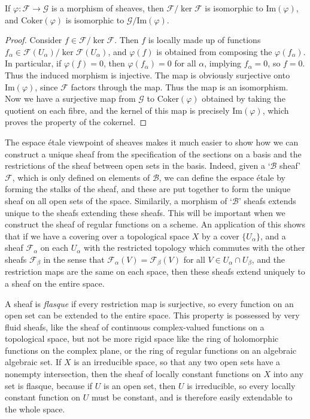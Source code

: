 \begin{theorem}
    If $\varphi: \mathcal{F} \to \mathcal{G}$ is a morphism of sheaves, then $\mathcal{F} / \ker \mathcal{F}$ is isomorphic to $\text{Im}(\varphi)$, and $\text{Coker}(\varphi)$ is isomorphic to $\mathcal{G} / \text{Im}(\varphi)$.
\end{theorem}
\begin{proof}
    Consider $f \in \mathcal{F} / \ker \mathcal{F}$. Then $f$ is locally made up of functions $f_\alpha \in \mathcal{F}(U_\alpha) / \ker \mathcal{F}(U_\alpha)$, and $\varphi(f)$ is obtained from composing the $\varphi(f_\alpha)$. In particular, if $\varphi(f) = 0$, then $\varphi(f_\alpha) = 0$ for all $\alpha$, implying $f_\alpha = 0$, so $f = 0$. Thus the induced morphism is injective. The map is obviously surjective onto $\text{Im}(\varphi)$, since $\mathcal{F}$ factors through the map. Thus the map is an isomorphism. Now we have a surjective map from $\mathcal{G}$ to $\text{Coker}(\varphi)$ obtained by taking the quotient on each fibre, and the kernel of this map is precisely $\text{Im}(\varphi)$, which proves the property of the cokernel.
\end{proof}

The espace \'{e}tale viewpoint of sheaves makes it much easier to show how we can construct a unique sheaf from the specification of the sections on a basis and the restrictions of the sheaf between open sets in the basis. Indeed, given a `$\mathcal{B}$ sheaf' $\mathcal{F}$, which is only defined on elements of $\mathcal{B}$, we can define the espace \'{e}tale by forming the stalks of the sheaf, and these are put together to form the unique sheaf on all open sets of the space. Similarily, a morphism of `$\mathcal{B}$' sheafs extends unique to the sheafs extending these sheafs. This will be important when we construct the sheaf of regular functions on a scheme. An application of this shows that if we have a covering over a topological space $X$ by a cover $\{ U_\alpha \}$, and a sheaf $\mathcal{F}_\alpha$ on each $U_\alpha$ with the restricted topology which commutes with the other sheafs $\mathcal{F}_\beta$ in the sense that $\mathcal{F}_\alpha(V) = \mathcal{F}_\beta(V)$ for all $V \in U_\alpha \cap U_\beta$, and the restriction maps are the same on each space, then these sheafs extend uniquely to a sheaf on the entire space.

A sheaf is \emph{flasque} if every restriction map is surjective, so every function on an open set can be extended to the entire space. This property is possessed by very fluid sheafs, like the sheaf of continuous complex-valued functions on a topological space, but not be more rigid space like the ring of holomorphic functions on the complex plane, or the ring of regular functions on an algebraic algebraic set. If $X$ is an irreducible space, so that any two open sets have a nonempty intersection, then the sheaf of locally constant functions on $X$ into any set is flasque, because if $U$ is an open set, then $U$ is irreducible, so every locally constant function on $U$ must be constant, and is therefore easily extendable to the whole space.

